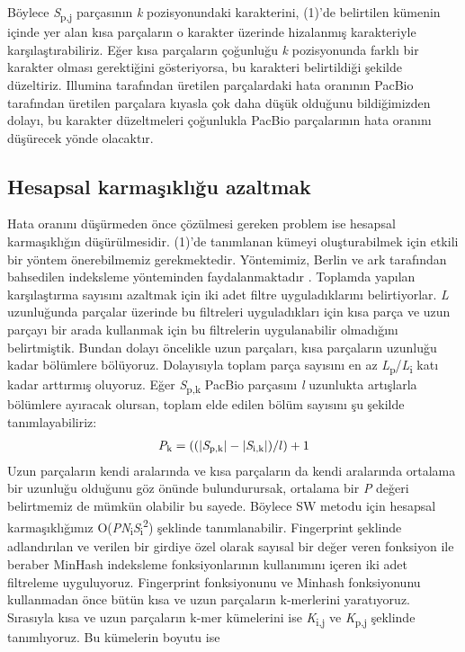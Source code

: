 Böylece \textit{S}\textsubscript{p,j} parçasının \textit{k} pozisyonundaki karakterini, (1)'de belirtilen kümenin içinde yer alan kısa parçaların o karakter üzerinde hizalanmış karakteriyle karşılaştırabiliriz. Eğer kısa parçaların çoğunluğu \textit{k} pozisyonunda farklı bir karakter olması gerektiğini gösteriyorsa, bu karakteri belirtildiği şekilde düzeltiriz. Illumina tarafından üretilen parçalardaki hata oranının PacBio tarafından üretilen parçalara kıyasla çok daha düşük olduğunu bildiğimizden dolayı, bu karakter düzeltmeleri çoğunlukla PacBio parçalarının hata oranını düşürecek yönde olacaktır.

\subsection{Hesapsal karmaşıklığu azaltmak}
Hata oranını düşürmeden önce çözülmesi gereken problem ise hesapsal karmaşıklığın düşürülmesidir. (1)'de tanımlanan kümeyi oluşturabilmek için etkili bir yöntem önerebilmemiz gerekmektedir. Yöntemimiz, Berlin ve ark tarafından bahsedilen indeksleme yönteminden faydalanmaktadır \cite{berlin}. Toplamda yapılan karşılaştırma sayısını azaltmak için iki adet filtre uyguladıklarını belirtiyorlar. \textit{L} uzunluğunda parçalar üzerinde bu filtreleri uyguladıkları için kısa parça ve uzun parçayı bir arada kullanmak için bu filtrelerin uygulanabilir olmadığını belirtmiştik. Bundan dolayı öncelikle uzun parçaları, kısa parçaların uzunluğu kadar bölümlere bölüyoruz. Dolayısıyla toplam parça sayısını en az \textit{L}\textsubscript{p}/\textit{L}\textsubscript{i} katı kadar arttırmış oluyoruz. Eğer \textit{S}\textsubscript{p,k} PacBio parçasını \textit{l} uzunlukta artışlarla bölümlere ayıracak olursan, toplam elde edilen bölüm sayısını şu şekilde tanımlayabiliriz:
\begin{gather*}
\textit{P}\textsubscript{k} = ((|\textit{S}\textsubscript{p,k}| - |\textit{S}\textsubscript{i,k}| )/l) + 1
\end{gather*}
Uzun parçaların kendi aralarında ve kısa parçaların da kendi aralarında ortalama bir uzunluğu olduğunu göz önünde bulundurursak, ortalama bir \textit{P} değeri belirtmemiz de mümkün olabilir bu sayede. Böylece SW metodu için hesapsal karmaşıklığımız O(\textit{P}\textit{N}\textsubscript{i}\textbar\textit{S}\textsubscript{i}\textbar\textsuperscript{2}) şeklinde tanımlanabilir. Fingerprint şeklinde adlandırılan ve verilen bir girdiye özel olarak sayısal bir değer veren fonksiyon ile beraber MinHash indeksleme fonksiyonlarının kullanımını içeren iki adet filtreleme uyguluyoruz. Fingerprint fonksiyonunu ve Minhash fonksiyonunu kullanmadan önce bütün kısa ve uzun parçaların k-merlerini yaratıyoruz. Sırasıyla kısa ve uzun parçaların k-mer kümelerini ise \textit{K}\textsubscript{i,j} ve \textit{K}\textsubscript{p,j} şeklinde tanımlıyoruz. Bu kümelerin boyutu ise
